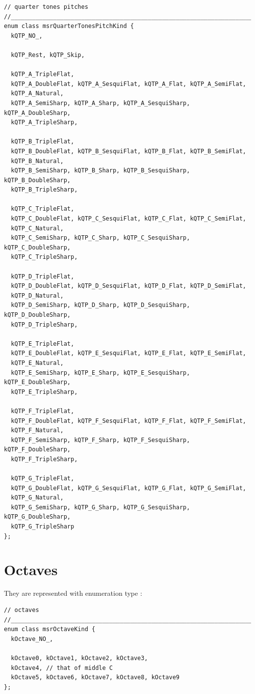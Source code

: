 \begin{lstlisting}[language=CPlusPlus]
// quarter tones pitches
//______________________________________________________________________________
enum class msrQuarterTonesPitchKind {
  kQTP_NO_,

  kQTP_Rest, kQTP_Skip,

  kQTP_A_TripleFlat,
  kQTP_A_DoubleFlat, kQTP_A_SesquiFlat, kQTP_A_Flat, kQTP_A_SemiFlat,
  kQTP_A_Natural,
  kQTP_A_SemiSharp, kQTP_A_Sharp, kQTP_A_SesquiSharp, kQTP_A_DoubleSharp,
  kQTP_A_TripleSharp,

  kQTP_B_TripleFlat,
  kQTP_B_DoubleFlat, kQTP_B_SesquiFlat, kQTP_B_Flat, kQTP_B_SemiFlat,
  kQTP_B_Natural,
  kQTP_B_SemiSharp, kQTP_B_Sharp, kQTP_B_SesquiSharp, kQTP_B_DoubleSharp,
  kQTP_B_TripleSharp,

  kQTP_C_TripleFlat,
  kQTP_C_DoubleFlat, kQTP_C_SesquiFlat, kQTP_C_Flat, kQTP_C_SemiFlat,
  kQTP_C_Natural,
  kQTP_C_SemiSharp, kQTP_C_Sharp, kQTP_C_SesquiSharp, kQTP_C_DoubleSharp,
  kQTP_C_TripleSharp,

  kQTP_D_TripleFlat,
  kQTP_D_DoubleFlat, kQTP_D_SesquiFlat, kQTP_D_Flat, kQTP_D_SemiFlat,
  kQTP_D_Natural,
  kQTP_D_SemiSharp, kQTP_D_Sharp, kQTP_D_SesquiSharp, kQTP_D_DoubleSharp,
  kQTP_D_TripleSharp,

  kQTP_E_TripleFlat,
  kQTP_E_DoubleFlat, kQTP_E_SesquiFlat, kQTP_E_Flat, kQTP_E_SemiFlat,
  kQTP_E_Natural,
  kQTP_E_SemiSharp, kQTP_E_Sharp, kQTP_E_SesquiSharp, kQTP_E_DoubleSharp,
  kQTP_E_TripleSharp,

  kQTP_F_TripleFlat,
  kQTP_F_DoubleFlat, kQTP_F_SesquiFlat, kQTP_F_Flat, kQTP_F_SemiFlat,
  kQTP_F_Natural,
  kQTP_F_SemiSharp, kQTP_F_Sharp, kQTP_F_SesquiSharp, kQTP_F_DoubleSharp,
  kQTP_F_TripleSharp,

  kQTP_G_TripleFlat,
  kQTP_G_DoubleFlat, kQTP_G_SesquiFlat, kQTP_G_Flat, kQTP_G_SemiFlat,
  kQTP_G_Natural,
  kQTP_G_SemiSharp, kQTP_G_Sharp, kQTP_G_SesquiSharp, kQTP_G_DoubleSharp,
  kQTP_G_TripleSharp
};
\end{lstlisting}


\section{Octaves}\label{Octaves}

They are represented with enumeration type {\tt }:
\begin{lstlisting}[language=CPlusPlus]
// octaves
//______________________________________________________________________________
enum class msrOctaveKind {
  kOctave_NO_,

  kOctave0, kOctave1, kOctave2, kOctave3,
  kOctave4, // that of middle C
  kOctave5, kOctave6, kOctave7, kOctave8, kOctave9
};
\end{lstlisting}

